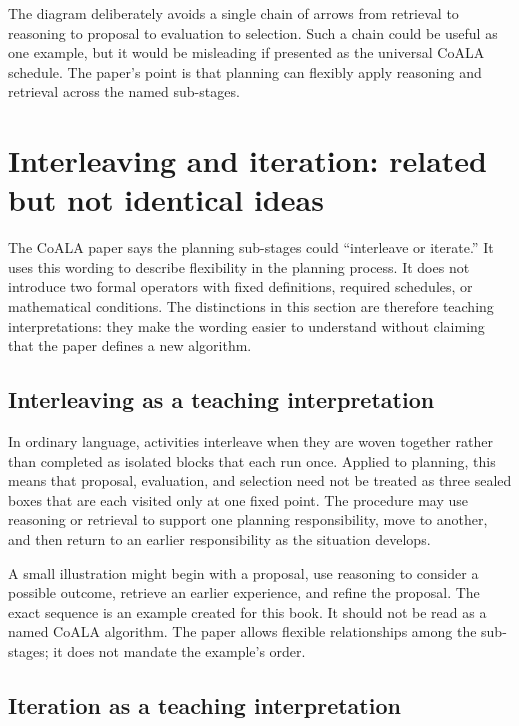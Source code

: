 The diagram deliberately avoids a single chain of arrows from retrieval to reasoning to proposal to evaluation to selection. Such a chain could be useful as one example, but it would be misleading if presented as the universal CoALA schedule. The paper's point is that planning can flexibly apply reasoning and retrieval across the named sub-stages.

\section{Interleaving and iteration: related but not identical ideas}
\label{sec:interleaving-iteration}

The CoALA paper says the planning sub-stages could ``interleave or iterate.'' It uses this wording to describe flexibility in the planning process. It does not introduce two formal operators with fixed definitions, required schedules, or mathematical conditions. The distinctions in this section are therefore teaching interpretations: they make the wording easier to understand without claiming that the paper defines a new algorithm.

\subsection{Interleaving as a teaching interpretation}

In ordinary language, activities interleave when they are woven together rather than completed as isolated blocks that each run once. Applied to planning, this means that proposal, evaluation, and selection need not be treated as three sealed boxes that are each visited only at one fixed point. The procedure may use reasoning or retrieval to support one planning responsibility, move to another, and then return to an earlier responsibility as the situation develops.

A small illustration might begin with a proposal, use reasoning to consider a possible outcome, retrieve an earlier experience, and refine the proposal. The exact sequence is an example created for this book. It should not be read as a named CoALA algorithm. The paper allows flexible relationships among the sub-stages; it does not mandate the example's order.

\subsection{Iteration as a teaching interpretation}

